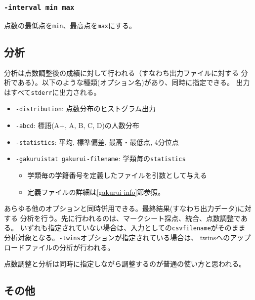 \subsubsection{\texttt{-interval min max}}
\label{-intervalminmax}

点数の最低点を\texttt{min}、最高点を\texttt{max}にする。

\subsection{分析}
\label{分析}

分析は点数調整後の成績に対して行われる（すなわち出力ファイルに対する
分析である）。以下のような種類(オプション名)があり、同時に指定できる。
出力はすべて\texttt{stderr}に出力される。

\begin{itemize}
\item \texttt{-distribution}: 点数分布のヒストグラム出力

\item \texttt{-abcd}: 標語(A+, A, B, C, D)の人数分布

\item \texttt{-statistics}: 平均, 標準偏差, 最高・最低点, 4分位点

\item \texttt{-gakuruistat gakurui-filename}: 学類毎の\texttt{statistics}

\begin{itemize}
\item 学類毎の学籍番号を定義したファイルを引数として与える

\item 定義ファイルの詳細は\ref{gakurui-info}節参照。

\end{itemize}

\end{itemize}

あらゆる他のオプションと同時併用できる。最終結果(すなわち出力データ)に対する
分析を行う。先に行われるのは、マークシート採点、統合、点数調整である。
いずれも指定されていない場合は、入力としての\texttt{csvfilename}がそのまま
分析対象となる。\texttt{-twins}オプションが指定されている場合は、
twinsへのアップロードファイルの分析が行われる。

点数調整と分析は同時に指定しながら調整するのが普通の使い方と思われる。

\subsection{その他}
\label{その他}


